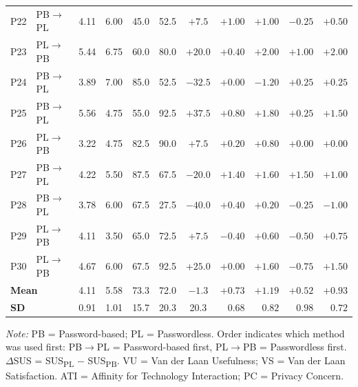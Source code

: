 \documentclass{article}
\begin{document}
\begin{table}[htbp]
\begin{threeparttable}
\begin{tabular}{clccrrcrrrr}
            P22 & PB$\rightarrow$PL & 4.11 & 6.00 & 45.0 & 52.5 & $+7.5$ & $+1.00$ & $+1.00$ & $-0.25$ & $+0.50$ \\
            P23 & PL$\rightarrow$PB & 5.44 & 6.75 & 60.0 & 80.0 & $+20.0$ & $+0.40$ & $+2.00$ & $+1.00$ & $+2.00$ \\
            P24 & PB$\rightarrow$PL & 3.89 & 7.00 & 85.0 & 52.5 & $-32.5$ & $+0.00$ & $-1.20$ & $+0.25$ & $+0.25$ \\
            P25 & PB$\rightarrow$PL & 5.56 & 4.75 & 55.0 & 92.5 & $+37.5$ & $+0.80$ & $+1.80$ & $+0.25$ & $+1.50$ \\
            P26 & PL$\rightarrow$PB & 3.22 & 4.75 & 82.5 & 90.0 & $+7.5$ & $+0.20$ & $+0.80$ & $+0.00$ & $+0.00$ \\
            P27 & PB$\rightarrow$PL & 4.22 & 5.50 & 87.5 & 67.5 & $-20.0$ & $+1.40$ & $+1.60$ & $+1.50$ & $+1.00$ \\
            P28 & PB$\rightarrow$PL & 3.78 & 6.00 & 67.5 & 27.5 & $-40.0$ & $+0.40$ & $+0.20$ & $-0.25$ & $-1.00$ \\
            P29 & PL$\rightarrow$PB & 4.11 & 3.50 & 65.0 & 72.5 & $+7.5$ & $-0.40$ & $+0.60$ & $-0.50$ & $+0.75$ \\
            P30 & PL$\rightarrow$PB & 4.67 & 6.00 & 67.5 & 92.5 & $+25.0$ & $+0.00$ & $+1.60$ & $-0.75$ & $+1.50$ \\
            \midrule
            \multicolumn{2}{l}{\textbf{Mean}} & 4.11 & 5.58 & 73.3 & 72.0 & $-1.3$ & $+0.73$ & $+1.19$ & $+0.52$ & $+0.93$ \\
            \multicolumn{2}{l}{\textbf{SD}} & 0.91 & 1.01 & 15.7 & 20.3 & 20.3 & $0.68$ & $0.82$ & $0.98$ & $0.72$ \\
            \bottomrule
        \end{tabular}
        \begin{tablenotes}
            \small
            \item \textit{Note:} PB = Password-based; PL = Passwordless. Order indicates which method was used first: PB$\rightarrow$PL = Password-based first, PL$\rightarrow$PB = Passwordless first. $\Delta$SUS = SUS\textsubscript{PL} $-$ SUS\textsubscript{PB}. VU = Van der Laan Usefulness; VS = Van der Laan Satisfaction. ATI = Affinity for Technology Interaction; PC = Privacy Concern.
        \end{tablenotes}
    \end{threeparttable}
\end{table}
\end{document}
